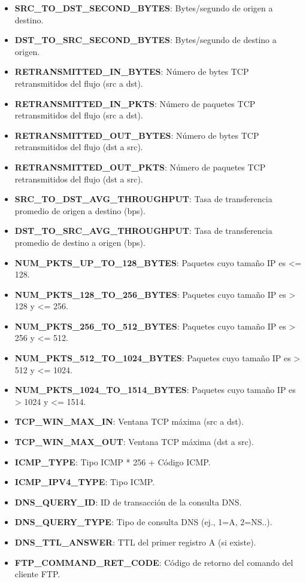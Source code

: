 \begin{itemize}
    \item \textbf{SRC\_TO\_DST\_SECOND\_BYTES}: Bytes/segundo de origen a destino.
    \item \textbf{DST\_TO\_SRC\_SECOND\_BYTES}: Bytes/segundo de destino a origen.
    \item \textbf{RETRANSMITTED\_IN\_BYTES}: Número de bytes TCP retransmitidos del flujo (src a dst).
    \item \textbf{RETRANSMITTED\_IN\_PKTS}: Número de paquetes TCP retransmitidos del flujo (src a dst).
    \item \textbf{RETRANSMITTED\_OUT\_BYTES}: Número de bytes TCP retransmitidos del flujo (dst a src).
    \item \textbf{RETRANSMITTED\_OUT\_PKTS}: Número de paquetes TCP retransmitidos del flujo (dst a src).
    \item \textbf{SRC\_TO\_DST\_AVG\_THROUGHPUT}: Tasa de transferencia promedio de origen a destino (bps).
    \item \textbf{DST\_TO\_SRC\_AVG\_THROUGHPUT}: Tasa de transferencia promedio de destino a origen (bps).
    \item \textbf{NUM\_PKTS\_UP\_TO\_128\_BYTES}: Paquetes cuyo tamaño IP es <= 128.
    \item \textbf{NUM\_PKTS\_128\_TO\_256\_BYTES}: Paquetes cuyo tamaño IP es  > 128 y <= 256.
    \item \textbf{NUM\_PKTS\_256\_TO\_512\_BYTES}: Paquetes cuyo tamaño IP es > 256 y <= 512.
    \item \textbf{NUM\_PKTS\_512\_TO\_1024\_BYTES}: Paquetes cuyo tamaño IP es > 512 y <= 1024.
    \item \textbf{NUM\_PKTS\_1024\_TO\_1514\_BYTES}: Paquetes cuyo tamaño IP es > 1024 y <= 1514.
    \item \textbf{TCP\_WIN\_MAX\_IN}: Ventana TCP máxima (src a dst).
    \item \textbf{TCP\_WIN\_MAX\_OUT}: Ventana TCP máxima (dst a src).
    \item \textbf{ICMP\_TYPE}: Tipo ICMP * 256 + Código ICMP.
    \item \textbf{ICMP\_IPV4\_TYPE}: Tipo ICMP.
    \item \textbf{DNS\_QUERY\_ID}: ID de transacción de la consulta DNS.
    \item \textbf{DNS\_QUERY\_TYPE}: Tipo de consulta DNS (ej., 1=A, 2=NS..).
    \item \textbf{DNS\_TTL\_ANSWER}: TTL del primer registro A (si existe).
    \item \textbf{FTP\_COMMAND\_RET\_CODE}: Código de retorno del comando del cliente FTP.

\end{itemize}
